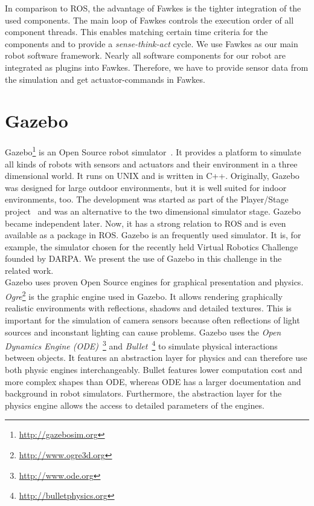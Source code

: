 In comparison to ROS, the advantage of Fawkes is the tighter integration of the used components. The main loop of Fawkes controls the execution order of all component threads. This enables matching certain time criteria for the components and to provide a \textit{sense-think-act} cycle. We use Fawkes as our main robot software framework. Nearly all software components for our robot are integrated as plugins into Fawkes. Therefore, we have to provide sensor data from the simulation and get actuator-commands in Fawkes.

\section{Gazebo}
\label{sec:gazebo}
Gazebo\footnote{\url{http://gazebosim.org}} is an Open Source robot simulator~\cite{GazeboDesign}. It provides a platform to simulate all kinds of robots with sensors and actuators and their environment in a three dimensional world. It runs on UNIX and is written in C++. Originally, Gazebo was designed for large outdoor environments, but it is well suited for indoor environments, too. The development was started as part of the Player/Stage project~\cite{PlayerStage} and was an alternative to the two dimensional simulator stage. Gazebo became independent later. Now, it has a strong relation to ROS and is even available as a package in ROS. Gazebo is an frequently used simulator. It is, for example, the simulator chosen for the recently held Virtual Robotics Challenge founded by DARPA. We present the use of Gazebo in this challenge in the related work.\\
Gazebo uses proven Open Source engines for graphical presentation and physics. \textit{Ogre}\footnote{\url{http://www.ogre3d.org}} is the graphic engine used in Gazebo. It allows rendering graphically realistic environments with reflections, shadows and detailed textures. This is important for the simulation of camera sensors because often reflections of light sources and inconstant lighting can cause problems. Gazebo uses the \textit{Open Dynamics Engine (ODE)}~\footnote{\url{http://www.ode.org}} and \textit{Bullet}~\footnote{\url{http://bulletphysics.org}} to simulate physical interactions between objects. It features an abstraction layer for physics and can therefore use both physic engines interchangeably. Bullet features lower computation cost and more complex shapes than ODE, whereas ODE has a larger documentation and background in robot simulators. Furthermore, the abstraction layer for the physics engine allows the access to detailed parameters of the engines.\\
